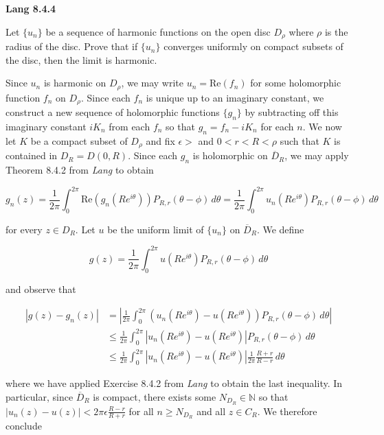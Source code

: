\textbf{Lang 8.4.4}

Let $\{u_n\}$ be a sequence of harmonic functions on the open disc $D_{\rho}$ where $\rho$ is the radius of the disc. 
Prove that if $\{u_n\}$ converges uniformly on compact subsets of the disc, then the limit is harmonic.

\begin{solution}
  Since $u_n$ is harmonic on $D_{\rho}$, we may write $u_n = \text{Re}(f_n)$ for some holomorphic function $f_n$ on 
  $D_{\rho}$. Since each $f_n$ is unique up to an imaginary constant, we construct a new sequence of holomorphic 
  functions $\{g_n\}$ by subtracting off this imaginary constant $i K_n$ from each $f_n$ so that $g_n = f_n - i K_n$ for 
  each $n$. We now let $K$ be a compact subset of $D_{\rho}$ and fix $\epsilon > $ and $0 < r < R < \rho$ such that $K$ 
  is contained in $D_R = D(0, R)$. Since each $g_n$ is holomorphic on $\overline{D}_R$, we may apply Theorem 8.4.2 from 
  \textit{Lang} to obtain

  $$
  g_n(z) = \frac{1}{2 \pi}\int_0^{2 \pi} \text{Re} \left(g_n(R e^{i \theta})\right) P_{R, r}(\theta - \phi) \, d\theta
         = \frac{1}{2 \pi}\int_0^{2 \pi} u_n(R e^{i \theta}) P_{R, r}(\theta - \phi) \, d\theta
  $$

  for every $z \in D_R$. Let $u$ be the uniform limit of $\{u_n\}$ on $\overline{D}_R$. We define

  $$
  g(z) = \frac{1}{2 \pi}\int_0^{2 \pi} u(R e^{i \theta}) P_{R, r}(\theta - \phi) \, d\theta
  $$

  and observe that 

  \begin{align*}
  |g(z) - g_n(z)| &= \left| \frac{1}{2 \pi}\int_0^{2 \pi} \left(u_n(R e^{i \theta}) - u(R e^{i \theta})\right) P_{R, r}(\theta - \phi) \, d\theta  \right| \\
                  &\le \frac{1}{2 \pi}\int_0^{2 \pi} \left|u_n(R e^{i \theta}) - u(R e^{i \theta})\right| P_{R, r}(\theta - \phi) \, d\theta \\
                  &\le \frac{1}{2 \pi}\int_0^{2 \pi} \left|u_n(R e^{i \theta}) - u(R e^{i \theta})\right| \frac{1}{2 \pi}\frac{R + r}{R - r} \, d\theta
  \end{align*}

  where we have applied Exercise 8.4.2 from \textit{Lang} to obtain the last inequality. In particular, since 
  $\overline{D}_R$ is compact, there exists some $N_{D_R} \in \mathbb{N}$ so that 
  $|u_n(z) - u(z)| < 2 \pi \epsilon \frac{R - r}{R + r}$ for all $n \ge N_{D_R}$ and all $z \in C_R$. We therefore 
  conclude


\end{solution}
